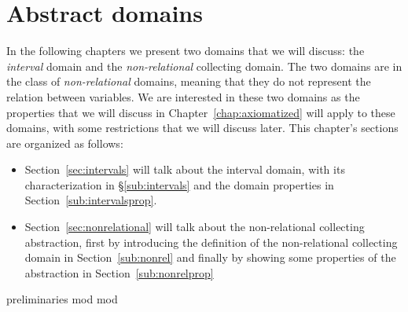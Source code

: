 \chapter{Abstract domains}\label{chap:abstractdomains}


In the following chapters we present two domains that we will discuss:
the \emph{interval} domain and the \emph{non-relational} collecting
domain. The two domains are in the class of \emph{non-relational}
domains, meaning that they do not represent the relation between
variables.  We are interested in these two domains as the
properties that we will discuss in Chapter~\ref{chap:axiomatized} will
apply to these domains, with some restrictions that we will discuss
later.  This chapter's sections are organized as follows:

\begin{itemize}
\item Section~\ref{sec:intervals} will talk about the interval domain,
  with its characterization in \S\ref{sub:intervals} and the domain
  properties in Section~\ref{sub:intervalsprop}.
\item Section~\ref{sec:nonrelational} will talk about the
  non-relational collecting abstraction, first by introducing the
  definition of the non-relational collecting domain in
  Section~\ref{sub:nonrel} and finally by showing some properties of
  the abstraction in Section~\ref{sub:nonrelprop}
\end{itemize}

{preliminaries}
{mod}
{mod}

